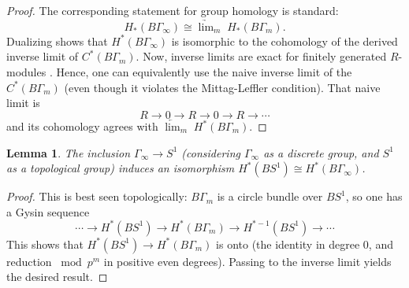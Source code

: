 \documentclass[JEP,XML,SOM,Unicode,NoFloatCountersInSection,published]{cedram}
\theoremstyle{plain}
\newtheorem{lemma}[theorem]{Lemma}
\theoremstyle{definition}
\let\iso\cong
\begin{document}
\begin{proof}
The corresponding statement for group homology is standard:
\begin{equation*}
H_*(B\Gamma_\infty) \iso \underrightarrow{\lim}_m \;H_*(B\Gamma_m).
\end{equation*}
Dualizing shows that $H^*(B\Gamma_\infty)$ is isomorphic to the cohomology of the derived inverse limit of $C^*(B\Gamma_m)$. Now, inverse limits are exact for finitely generated $R$-modules \cite[Th.\,1]{jensen70}. Hence, one can equivalently use the naive inverse limit of the $C^*(B\Gamma_m)$ (even though it violates the Mittag-Leffler condition). That naive limit is
\begin{equation*}
R \to 0 \to R \to 0 \to R \to \cdots
\end{equation*}
and its cohomology agrees with $\underleftarrow{\lim}_m \; H^*(B\Gamma_m)$.
\end{proof}

\begin{lemma}
The inclusion $\Gamma_\infty \to S^1$ (considering $\Gamma_\infty$ as a discrete group, and $S^1$ as a topological group) induces an isomorphism $H^*(BS^1) \iso H^*(B\Gamma_\infty)$.
\end{lemma}

\begin{proof}
This is best seen topologically: $B\Gamma_m$ is a circle bundle over $BS^1$, so one has a Gysin sequence
\begin{equation}\label{eq:gysin}
\cdots \to H^*(BS^1) \to H^*(B\Gamma_m) \to H^{*-1}(BS^1) \to \cdots
\end{equation}
This shows that $H^*(BS^1) \to H^*(B\Gamma_m)$ is onto (the identity in degree $0$, and reduction $\bmod p^m$ in positive even degrees). Passing to the inverse limit yields the desired result.
\end{proof}
\end{document}
